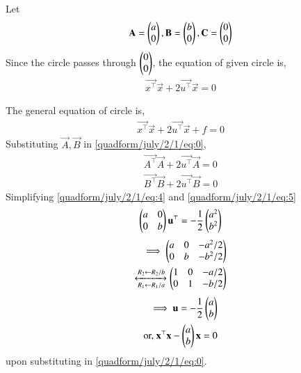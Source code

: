 Let 
\begin{align}
 \mathbf{A}=\begin{pmatrix}a\\0\end{pmatrix} ,
 \mathbf{B}=\begin{pmatrix}b\\0\end{pmatrix},
 \mathbf{C}=\begin{pmatrix}0\\0\end{pmatrix}
\end{align}
Since the circle passes through $\begin{pmatrix}0\\0\end{pmatrix}$, the equation of given circle is,
\begin{align}
    \vec{x^\top}\vec{x}+2\vec{u^\top}\vec{x}=0 \label{quadform/july/2/1/eq:0}
\end{align}

The general equation of circle is,
\begin{align}
\vec{x^\top}\vec{x}+2\vec{u^\top}\vec{x}+f=0 
\end{align}
Substituting $ \vec{A},  \vec{B}$ in \eqref{quadform/july/2/1/eq:0},
\begin{align}
    \vec{A^\top}\vec{A}+2\vec{u^\top}\vec{A}=0 \label{quadform/july/2/1/eq:4}
    \\
    \vec{B^\top}\vec{B}+2\vec{u^\top}\vec{B}=0 \label{quadform/july/2/1/eq:5}
\end{align}
Simplifying \eqref{quadform/july/2/1/eq:4} and \eqref{quadform/july/2/1/eq:5}
\begin{align}
    \begin{pmatrix}a & 0 \\ 0 & b\end{pmatrix}\mathbf{u}^\top= -\frac{1}{2}\begin{pmatrix}a^2 \\ b^2\end{pmatrix}
\end{align}
\begin{align}
\implies \begin{pmatrix}a & 0 & -a^2/2 \\ 0 & b & -b^2/2\end{pmatrix}
\\
\xleftrightarrow [R_1\leftarrow R_1/a]{R_2\leftarrow R_2/b}
\begin{pmatrix}1 & 0 & -a/2 \\ 0& 1 & -b/2\end{pmatrix}
\end{align}
\begin{align}
    \implies \mathbf{u}=-\frac{1}{2}\begin{pmatrix}a \\ b\end{pmatrix}
     \\
     \text{or, } \mathbf{x^\top}\mathbf{x}-\begin{pmatrix}a \\ b \end{pmatrix}\mathbf{x}=0
\end{align}
upon substituting  in \eqref{quadform/july/2/1/eq:0}.
 
